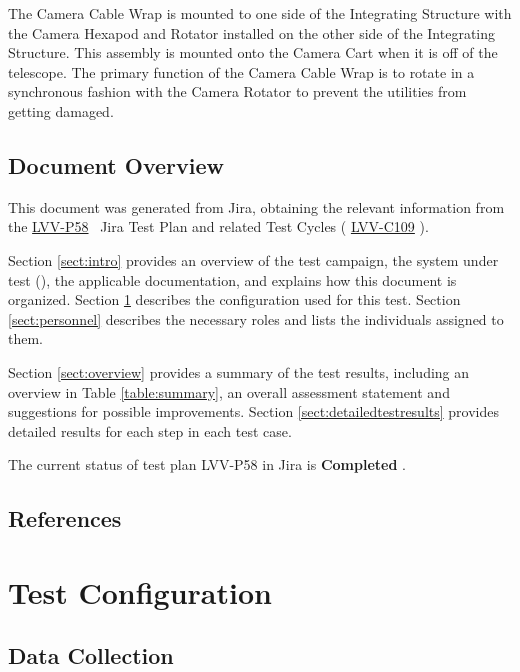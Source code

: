 \documentclass[SE,lsstdraft,STR,toc]{lsstdoc}
\begin{document}
 The Camera Cable Wrap is mounted to one side of the Integrating
Structure with the Camera Hexapod and Rotator installed on the other
side of the Integrating Structure. This assembly is mounted onto the
Camera Cart when it is off of the telescope. The primary function of the
Camera Cable Wrap is to rotate in a synchronous fashion with the Camera
Rotator to prevent the utilities from getting damaged.


\subsection{Document Overview}
\label{sect:docoverview}

This document was generated from Jira, obtaining the relevant information from the 
\href{https://jira.lsstcorp.org/secure/Tests.jspa#/testPlan/LVV-P58}{LVV-P58}
~Jira Test Plan and related Test Cycles (
  \href{https://jira.lsstcorp.org/secure/Tests.jspa#/testCycle/LVV-C109}{LVV-C109}
).

Section \ref{sect:intro} provides an overview of the test campaign, the system under test (\product{}), the applicable documentation, and explains how this document is organized.
Section \ref{sect:configuration}  describes the configuration used for this test.
Section \ref{sect:personnel} describes the necessary roles and lists the individuals assigned to them.

Section \ref{sect:overview} provides a summary of the test results, including an overview in Table \ref{table:summary}, an overall assessment statement and suggestions for possible improvements.
Section \ref{sect:detailedtestresults} provides detailed results for each step in each test case.

The current status of test plan LVV-P58 in Jira is \textbf{ Completed }.

\subsection{References}
\label{sect:references}
\renewcommand{\refname}{}

\section{Test Configuration}
\label{sect:configuration}

\subsection{Data Collection}
\end{document}
